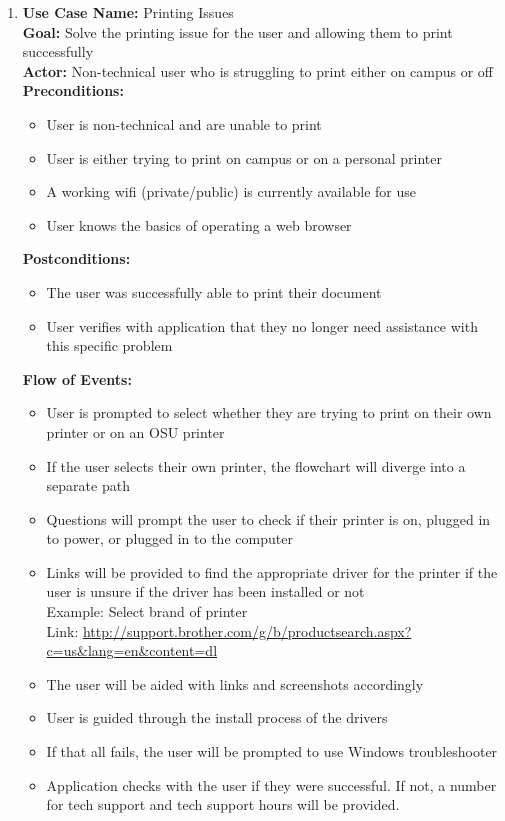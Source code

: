 \documentclass[12pt, letterpaper]{article}
\begin{document}
\begin{enumerate}
	\item \textbf{Use Case Name:} Printing Issues
\\\textbf{Goal:} Solve the printing issue for the user and allowing them to print successfully
\\\textbf{Actor:} Non-technical user who is struggling to print either on campus or off
\\\textbf{Preconditions:}
\begin{itemize}
	\item User is non-technical and are unable to print
	\item User is either trying to print on campus or on a personal printer
	\item A working wifi (private/public) is currently available for use 
	\item User knows the basics of operating a web browser
\end{itemize}
\textbf{Postconditions:}
\begin{itemize}
	\item The user was successfully able to print their document
	\item User verifies with application that they no longer need assistance with this specific problem 
\end{itemize}
\textbf{Flow of Events:}
\begin{itemize}
	\item User is prompted to select whether they are trying to print on their own printer or on an OSU printer
	\item If the user selects their own printer, the flowchart will diverge into a separate path
	\item Questions will prompt the user to check if their printer is on, plugged in to power, or plugged in to the computer
	\item Links will be provided to find the appropriate driver for the printer if the user is unsure if the driver has been installed or not
	\\Example:
	Select brand of printer
	\\Link: 
	\url{http://support.brother.com/g/b/productsearch.aspx?c=us&lang=en&content=dl}
	\item The user will be aided with links and screenshots accordingly
	\item User is guided through the install process of the drivers
	\item If that all fails, the user will be prompted to use Windows troubleshooter
	\item Application checks with the user if they were successful. If not, a number for tech support and tech support hours will be provided.

\end{itemize}
\end{enumerate}
\end{document}
